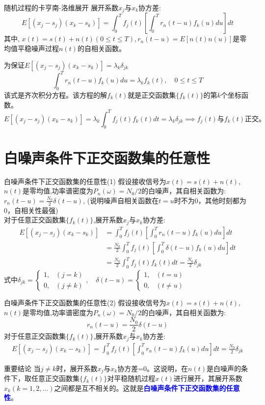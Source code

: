 \begin{frame}{随机过程的卡亨南-洛维展开}
展开系数$x_j$与$x_k$协方差:
\[E[(x_j-s_j)(x_k-s_k)]=\int_{0}^{T}f_j(t)\left[\int_{0}^{T}r_n(t-u)f_k(u)du\right]dt \]
其中, $x(t)=s(t)+n(t)(0\le t\le T),r_n(t-u)=E[n(t)n(u)]$是零均值平稳噪声过程$n(t)$的自相关函数。

为保证$E[(x_j-s_j)(x_k-s_k)]=\lambda_k\delta_{jk}$
\[\int_{0}^{T}r_n(t-u)f_k(u)du=\lambda_kf_k(t), \quad 0\le t\le T \]
该式是齐次积分方程。该方程的解$f_k(t)$就是正交函数集$\{f_k(t) \}$的第$k$个坐标函数。
\[ E[(x_j-s_j)(x_k-s_k)]=\lambda_k\int_{0}^{T}f_j(t)f_k(t)dt=\lambda_k\delta_{jk} \implies f_j(t)\text{与}f_k(t)\text{正交。}\] 
\end{frame}

\section{白噪声条件下正交函数集的任意性}

\begin{frame}{白噪声条件下正交函数集的任意性(1)}
假设接收信号为$x(t)=s(t)+n(t)$, $n(t)$是零均值,功率谱密度为$P_n(\omega)=N_0/2$的白噪声，其自相关函数为: $r_n(t-u)=\frac{N_0}{2}\delta(t-u)$, (说明噪声自相关函数在$t=u$时不为0，其他时刻都为0，自相关性最强)\\
对于任意正交函数集$\{f_k(t)\}$,展开系数$x_j$与$x_k$协方差:
\begin{align*}
E[(x_j-s_j)(x_k-s_k)]&=\int_{0}^{T}f_j(t)\left[\int_{0}^{T}r_n(t-u)f_k(u)du\right]dt\\
&=\frac{N_0}{2}\int_{0}^{T}f_j(t)\left[\int_{0}^{T}\delta(t-u)f_k(u)du\right]dt\\
&=\frac{N_0}{2}\int_{0}^{T}f_j(t)f_k(t)dt=\frac{N_0}{2}\delta_{jk}
\end{align*}
式中$\delta_{jk}=
\begin{cases}
1, & (j=k)\\
0, & (j\ne k) 
\end{cases},\quad
\delta(t-u)=
\begin{cases}
1, & (t=u)\\
0, & (t\ne u) 
\end{cases}
$
\end{frame}

\begin{frame}{白噪声条件下正交函数集的任意性(2)}
假设接收信号为$x(t)=s(t)+n(t)$, $n(t)$是零均值,功率谱密度为$P_n(\omega)=N_0/2$的白噪声，其自相关函数为: 
\[r_n(t-u)=\frac{N_0}{2}\delta(t-u)\]
对于任意正交函数集$\{f_k(t)\}$,展开系数$x_j$与$x_k$协方差:
\begin{align*}
E[(x_j-s_j)(x_k-s_k)]=\int_{0}^{T}f_j(t)\left[\int_{0}^{T}r_n(t-u)f_k(u)du\right]dt=\frac{N_0}{2}\delta_{jk}
\end{align*}
\begin{block}{重要结论}
当$j\ne k$时，展开系数$x_j$与$x_k$协方差=0。这说明，在$n(t)$是白噪声的条件下，取任意正交函数集$\{f_k(t)\}$对平稳随机过程$x(t)$进行展开，其展开系数$x_k(k=1,2,\dots)$之间都是互不相关的。这就是\textbf{\textcolor{blue}{白噪声条件下正交函数集的任意性}}。
\end{block}
\end{frame}

